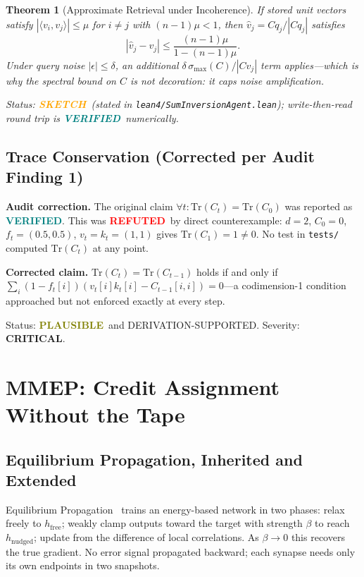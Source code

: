 \documentclass[11pt,letterpaper]{article}
\newtheorem{theorem}{Theorem}[section]
\newcommand{\VERIFIED}{\textbf{\textcolor{teal}{VERIFIED}}}
\newcommand{\SKETCH}{\textbf{\textcolor{orange}{SKETCH}}}
\newcommand{\REFUTED}{\textbf{\textcolor{red}{REFUTED}}}
\newcommand{\PLAUSIBLE}{\textbf{\textcolor{olive}{PLAUSIBLE}}}
\begin{document}
\begin{theorem}[Approximate Retrieval under Incoherence]
\label{thm:retrieval}
If stored unit vectors satisfy $|\langle v_i, v_j \rangle| \leq \mu$ for
$i \neq j$ with $(n-1)\mu < 1$, then $\hat{v}_j = Cq_j/|Cq_j|$ satisfies
\[
|\hat{v}_j - v_j| \leq \frac{(n-1)\mu}{1-(n-1)\mu}.
\]
Under query noise $|\epsilon| \leq \delta$, an additional $\delta\,\sigma_{\max}(C)/|Cv_j|$
term applies---which is why the spectral bound on $C$ is not decoration: it
caps noise amplification.

Status: \SKETCH\ (stated in \texttt{lean4/SumInversionAgent.lean}); write-then-read
round trip is \VERIFIED\ numerically.
\end{theorem}

\subsection{Trace Conservation (Corrected per Audit Finding 1)}

\begin{notebox}
\textbf{Audit correction.}
The original claim $\forall t: \mathrm{Tr}(C_t) = \mathrm{Tr}(C_0)$ was reported
as \VERIFIED.  This was \REFUTED\ by direct counterexample:
$d=2$, $C_0=0$, $f_t=(0.5,0.5)$, $v_t=k_t=(1,1)$ gives
$\mathrm{Tr}(C_1) = 1 \neq 0$.  No test in \texttt{tests/} computed
$\mathrm{Tr}(C_t)$ at any point.

\textbf{Corrected claim.}  $\mathrm{Tr}(C_t) = \mathrm{Tr}(C_{t-1})$ holds if
and only if
$\sum_i (1-f_t[i])(v_t[i]k_t[i] - C_{t-1}[i,i]) = 0$---a codimension-1
condition approached but not enforced exactly at every step.

Status: \PLAUSIBLE\ and DERIVATION-SUPPORTED.  Severity: \textbf{CRITICAL}.
\end{notebox}

\section{MMEP: Credit Assignment Without the Tape}
\label{sec:mmep}

\subsection{Equilibrium Propagation, Inherited and Extended}

Equilibrium Propagation~\cite{scellier2017} trains an energy-based network in
two phases: relax freely to $h_{\text{free}}$; weakly clamp outputs toward the
target with strength $\beta$ to reach $h_{\text{nudged}}$; update from the
difference of local correlations.  As $\beta \to 0$ this recovers the true
gradient.  No error signal propagated backward; each synapse needs only its
own endpoints in two snapshots.
\end{document}
